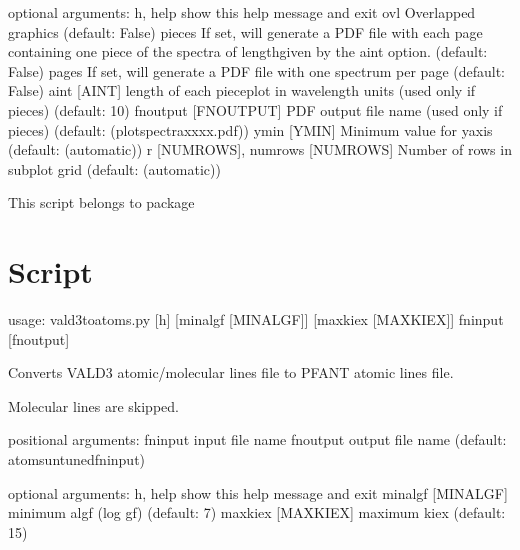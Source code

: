 \documentclass[letterpaper,10pt,english]{sphinxmanual}
\begin{document}
\begin{sphinxVerbatim}[commandchars=\\\{\}]
optional arguments:
  \PYGZhy{}h, \PYGZhy{}\PYGZhy{}help            show this help message and exit
  \PYGZhy{}\PYGZhy{}ovl                 Overlapped graphics (default: False)
  \PYGZhy{}\PYGZhy{}pieces              If set, will generate a PDF file with each page
                        containing one \PYGZdq{}piece\PYGZdq{} of the spectra of lengthgiven
                        by the \PYGZhy{}\PYGZhy{}aint option. (default: False)
  \PYGZhy{}\PYGZhy{}pages               If set, will generate a PDF file with one spectrum per
                        page (default: False)
  \PYGZhy{}\PYGZhy{}aint [AINT]         length of each piece\PYGZhy{}plot in wavelength units (used
                        only if \PYGZhy{}\PYGZhy{}pieces) (default: 10)
  \PYGZhy{}\PYGZhy{}fn\PYGZus{}output [FN\PYGZus{}OUTPUT]
                        PDF output file name (used only if \PYGZhy{}\PYGZhy{}pieces) (default:
                        (plot\PYGZhy{}spectra\PYGZhy{}\PYGZlt{}xxxx\PYGZgt{}.pdf))
  \PYGZhy{}\PYGZhy{}ymin [YMIN]         Minimum value for y\PYGZhy{}axis (default: (automatic))
  \PYGZhy{}r [NUM\PYGZus{}ROWS], \PYGZhy{}\PYGZhy{}num\PYGZus{}rows [NUM\PYGZus{}ROWS]
                        Number of rows in subplot grid (default: (automatic))
\end{sphinxVerbatim}

This script belongs to package 


\section{Script }
\label{\detokenize{autoscripts/script-vald3-to-atoms::doc}}\label{\detokenize{autoscripts/script-vald3-to-atoms:script-vald3-to-atoms-py}}
\begin{sphinxVerbatim}[commandchars=\\\{\}]
usage: vald3\PYGZhy{}to\PYGZhy{}atoms.py [\PYGZhy{}h] [\PYGZhy{}\PYGZhy{}min\PYGZus{}algf [MIN\PYGZus{}ALGF]] [\PYGZhy{}\PYGZhy{}max\PYGZus{}kiex [MAX\PYGZus{}KIEX]]
                         fn\PYGZus{}input [fn\PYGZus{}output]

Converts VALD3 atomic/molecular lines file to PFANT atomic lines file.

Molecular lines are skipped.

positional arguments:
  fn\PYGZus{}input              input file name
  fn\PYGZus{}output             output file name (default: atoms\PYGZhy{}untuned\PYGZhy{}\PYGZlt{}fn\PYGZus{}input\PYGZgt{})

optional arguments:
  \PYGZhy{}h, \PYGZhy{}\PYGZhy{}help            show this help message and exit
  \PYGZhy{}\PYGZhy{}min\PYGZus{}algf [MIN\PYGZus{}ALGF]
                        minimum algf (log gf) (default: \PYGZhy{}7)
  \PYGZhy{}\PYGZhy{}max\PYGZus{}kiex [MAX\PYGZus{}KIEX]
                        maximum kiex (default: 15)
\end{sphinxVerbatim}
\end{document}
